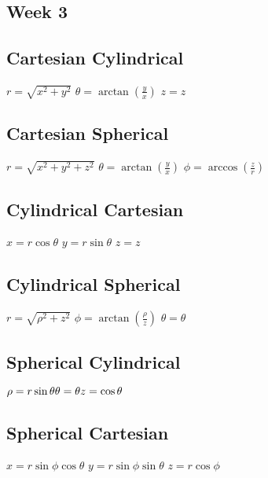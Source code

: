 \documentclass[12pt]{article}
\begin{document}
\begin{paracol}{2}
        \section*{Week 3}

        \subsection*{Cartesian \guillemotright Cylindrical}
        $r = \sqrt{x^2+y^2}$ \newline
        $\theta = \arctan(\frac{y}{x})$ \newline
        $z=z$

        \subsection*{Cartesian \guillemotright Spherical}
        $r=\sqrt{x^2+y^2+z^2}$ \newline
        $\theta = \arctan(\frac{y}{x})$ \newline
        $\phi = \arccos(\frac{z}{r})$

        \subsection*{Cylindrical \guillemotright Cartesian}
        $x = r \cos\theta$ \newline
        $y = r \sin\theta$ \newline
        $z = z$ \newline

        \switchcolumn

        \subsection*{Cylindrical \guillemotright Spherical}
        $r=\sqrt{\rho^2 + z^2}$ \newline
        $\phi = \arctan(\frac{\rho}{z})$ \newline
        $\theta = \theta$

        \subsection*{Spherical \guillemotright Cylindrical}
        $
        \rho = r \sin \theta \newline
        \theta = \theta \newline
        z = \cos \theta
        $

        \subsection*{Spherical \guillemotright Cartesian}
        $x = r \sin\phi \cos \theta$ \newline
        $y = r \sin\phi \sin \theta$    \newline
        $z = r \cos\phi$


\end{paracol}
\end{document}

